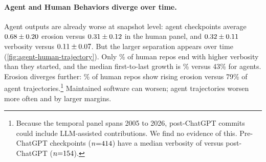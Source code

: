\paragraph{Agent and Human Behaviors diverge over time.}
Agent outputs are already worse at snapshot level: agent checkpoints average $0.68 \pm 0.20$ erosion versus $0.31 \pm 0.12$ in the human panel, and $0.32 \pm 0.11$ verbosity versus $0.11 \pm 0.07$. But the larger separation appears over time (\autoref{fig:agent-human-trajectory}). Only \avhTemporalVerbRisingPct{}\% of human repos end with higher verbosity than they started, and the median first-to-last growth is \avhTemporalVerbGrowthMedian{}\% versus 43\% for agents. Erosion diverges further: \avhTemporalErosRisingPct{}\% of human repos show rising erosion versus 79\% of agent trajectories.\footnote{Because the temporal panel spans 2005 to 2026, post-ChatGPT commits could include LLM-assisted contributions. We find no evidence of this. Pre-ChatGPT checkpoints ($n{=}414$) have a median verbosity of \avhTemporalPreVerbMedian{} versus \avhTemporalPostVerbMedian{} post-ChatGPT ($n{=}154$).} Maintained software can worsen; agent trajectories worsen more often and by larger margins.
